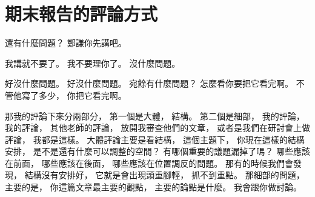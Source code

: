 \section{期末報告的評論方式}

\hypertarget{w01:cue:2999}{}還有什麼問題？
\hypertarget{w01:cue:3000}{}鄭謙你先講吧。

\hypertarget{w01:cue:3001}{}我講就不要了。
\hypertarget{w01:cue:3002}{}我不要理你了。
\hypertarget{w01:cue:3003}{}沒什麼問題。

\hypertarget{w01:cue:3004}{}好沒什麼問題。
\hypertarget{w01:cue:3005}{}好沒什麼問題。
\hypertarget{w01:cue:3006}{}宛餘有什麼問題？
\hypertarget{w01:cue:3007}{}怎麼看你要把它看完啊。
\hypertarget{w01:cue:3008}{}不管他寫了多少，
\hypertarget{w01:cue:3009}{}你把它看完啊。

\hypertarget{w01:cue:3010}{}那我的評論下來分兩部分，
\hypertarget{w01:cue:3011}{}第一個是大體，
\hypertarget{w01:cue:3012}{}結構。
\hypertarget{w01:cue:3013}{}第二個是細部，
\hypertarget{w01:cue:3014}{}我的評論，
\hypertarget{w01:cue:3015}{}我的評論，
\hypertarget{w01:cue:3016}{}其他老師的評論，
\hypertarget{w01:cue:3017}{}放開我審查他們的文章，
\hypertarget{w01:cue:3018}{}或者是我們在研討會上做評論，
\hypertarget{w01:cue:3019}{}我都是這樣。
\hypertarget{w01:cue:3020}{}大體評論主要是看結構，
\hypertarget{w01:cue:3021}{}這個主題下，
\hypertarget{w01:cue:3022}{}你現在這樣的結構安排，
\hypertarget{w01:cue:3023}{}是不是還有什麼可以調整的空間？
\hypertarget{w01:cue:3024}{}有哪個重要的議題漏掉了嗎？
\hypertarget{w01:cue:3025}{}哪些應該在前面，
\hypertarget{w01:cue:3026}{}哪些應該在後面，
\hypertarget{w01:cue:3027}{}哪些應該在位置調反的問題。
\hypertarget{w01:cue:3028}{}那有的時候我們會發現，
\hypertarget{w01:cue:3029}{}結構沒有安排好，
\hypertarget{w01:cue:3030}{}它就是會出現頭重腳輕，
\hypertarget{w01:cue:3031}{}抓不到重點。
\hypertarget{w01:cue:3032}{}那細部的問題，
\hypertarget{w01:cue:3033}{}主要的是，
\hypertarget{w01:cue:3034}{}你這篇文章最主要的觀點，
\hypertarget{w01:cue:3035}{}主要的論點是什麼。
\hypertarget{w01:cue:3036}{}我會跟你做討論。

